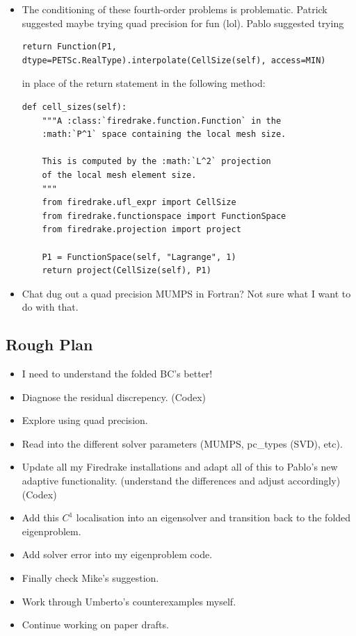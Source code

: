 \documentclass[12pt,a4paper]{article}
\begin{document}
\begin{itemize}
    \item The conditioning of these fourth-order problems is problematic. Patrick suggested maybe trying quad precision for fun (lol). Pablo suggested trying \begin{lstlisting}
return Function(P1, dtype=PETSc.RealType).interpolate(CellSize(self), access=MIN)
\end{lstlisting}
in place of the return statement in the following method:
\begin{lstlisting}
def cell_sizes(self):
    """A :class:`firedrake.function.Function` in the
    :math:`P^1` space containing the local mesh size.

    This is computed by the :math:`L^2` projection
    of the local mesh element size.
    """
    from firedrake.ufl_expr import CellSize
    from firedrake.functionspace import FunctionSpace
    from firedrake.projection import project

    P1 = FunctionSpace(self, "Lagrange", 1)
    return project(CellSize(self), P1)
\end{lstlisting}
\item Chat dug out a quad precision MUMPS in Fortran? Not sure what I want to do with that. 
\end{itemize}

\subsection{Rough Plan}

\begin{itemize}
    \item I need to understand the folded BC's better!
    \item Diagnose the residual discrepency. (Codex)
    \item Explore using quad precision. 
    \item Read into the different solver parameters (MUMPS, pc\_types (SVD), etc).
    \item Update all my Firedrake installations and adapt all of this to Pablo's new adaptive functionality. (understand the differences and adjust accordingly) (Codex)
    \item Add this $C^1$ localisation into an eigensolver and transition back to the folded eigenproblem. 
    \item Add solver error into my eigenproblem code. 
    \item Finally check Mike's suggestion.
    \item Work through Umberto's counterexamples myself. 
    \item Continue working on paper drafts. 
\end{itemize}
\end{document}
